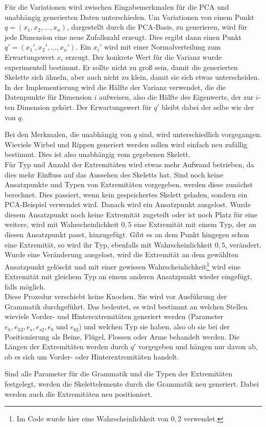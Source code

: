 Für die Variationen wird zwischen Eingabemerkmalen für die PCA und unabhängig generierten Daten unterschieden. Um Variationen von einem Punkt $q = (x_1, x_2,\dots, x_n)$, dargestellt durch die PCA-Basis, zu generieren, wird für jede Dimension eine neue Zufallszahl erzeugt. Dies ergibt dann einen Punkt $q' = (x_1', x_2',\dots,x_n')$. Ein $x_i'$ wird mit einer Normalverteilung zum Erwartungswert $x_i$ erzeugt.
Der konkrete Wert für die Varianz wurde experimentell bestimmt. Er sollte nicht zu groß sein, damit die generierten Skelette sich ähneln, aber auch nicht zu klein, damit sie sich etwas unterscheiden. In der Implementierung wird
die Hälfte der Varianz verwendet, die die Datenpunkte für Dimension $i$ aufweisen, also die Hälfte des Eigenwerts, der zur $i$-ten Dimension gehört. Der Erwartungswert für $q'$ bleibt dabei der selbe wie der von $q$.

Bei den Merkmalen, die unabhängig von $q$ sind, wird unterschiedlich vorgegangen. Wieviele Wirbel und Rippen generiert werden sollen wird einfach neu zufällig bestimmt. Dies ist also unabhängig vom gegebenen Skelett.\\
Für Typ und Anzahl der Extremitäten wird etwas mehr Aufwand betrieben, da dies mehr Einfluss auf das Aussehen des Skeletts hat.
Sind noch keine Ansatzpunkte und Typen von Extremitäten vorgegeben, werden diese zunächst berechnet. Dies passiert, wenn kein gespeichertes Skelett geladen, sondern ein PCA-Beispiel verwendet wird.
Danach wird ein Ansatzpunkt ausgelost. Wurde diesem Ansatzpunkt noch keine Extremität zugeteilt oder ist noch Platz für eine weitere, wird mit Wahrscheinlichkeit $0{,}5$ eine Extremität mit einem Typ, der an diesen Ansatzpunkt passt, hinzugefügt. Gibt es an dem Punkt hingegen schon eine Extremität, so wird ihr Typ, ebenfalls mit Wahrscheinlichkeit $0{,}5$, verändert. Wurde eine Veränderung ausgelost, wird die Extremität an dem gewählten Ansatzpunkt gelöscht und mit einer gewissen Wahrscheinlichkeit\footnote{Im Code wurde hier eine Wahrscheinlichkeit von $0{,}2$ verwendet.} wird eine Extremität mit gleichem Typ an einem anderen Ansatzpunkt wieder eingefügt, falls möglich.\\
Diese Prozedur verschiebt keine Knochen. Sie wird vor Ausführung der Grammatik durchgeführt. Das bedeutet, es wird bestimmt an welchen Stellen wieviele Vorder- und Hinterextremitäten generiert werden (Parameter $e_h, e_{h2}, e_s, e_{s2}, e_b$ und $e_{b2}$) und welchen Typ sie haben, also ob sie bei der Positionierung als Beine, Flügel, Flossen oder Arme behandelt werden.
Die Längen der Extremitäten werden durch $q'$ vorgegeben und hängen nur davon ab, ob es sich um Vorder- oder Hinterextremitäten handelt.

Sind alle Parameter für die Grammatik und die Typen der Extremitäten festgelegt, werden die Skelettelemente durch die Grammatik neu generiert. Dabei werden auch die Extremitäten neu positioniert.

